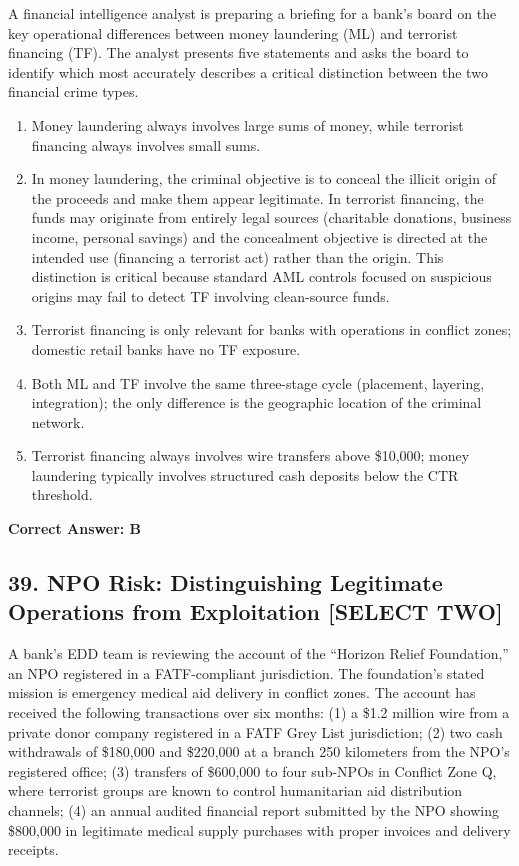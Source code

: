 \documentclass[11pt,a4paper]{article}
\begin{document}
	A financial intelligence analyst is preparing a briefing for a bank's board on the key operational differences between money laundering (ML) and terrorist financing (TF). The analyst presents five statements and asks the board to identify which most accurately describes a critical distinction between the two financial crime types.
	
	\begin{enumerate}[label=\Alph*.]
		\item Money laundering always involves large sums of money, while terrorist financing always involves small sums.
		\item In money laundering, the criminal objective is to conceal the illicit origin of the proceeds and make them appear legitimate. In terrorist financing, the funds may originate from entirely legal sources (charitable donations, business income, personal savings) and the concealment objective is directed at the intended use (financing a terrorist act) rather than the origin. This distinction is critical because standard AML controls focused on suspicious origins may fail to detect TF involving clean-source funds.
		\item Terrorist financing is only relevant for banks with operations in conflict zones; domestic retail banks have no TF exposure.
		\item Both ML and TF involve the same three-stage cycle (placement, layering, integration); the only difference is the geographic location of the criminal network.
		\item Terrorist financing always involves wire transfers above \$10,000; money laundering typically involves structured cash deposits below the CTR threshold.
	\end{enumerate}
	\textbf{Correct Answer: B}
	
	\subsection{39. NPO Risk: Distinguishing Legitimate Operations from Exploitation \textnormal{[SELECT TWO]}}
	
	A bank's EDD team is reviewing the account of the ``Horizon Relief Foundation,'' an NPO registered in a FATF-compliant jurisdiction. The foundation's stated mission is emergency medical aid delivery in conflict zones. The account has received the following transactions over six months: (1) a \$1.2 million wire from a private donor company registered in a FATF Grey List jurisdiction; (2) two cash withdrawals of \$180,000 and \$220,000 at a branch 250 kilometers from the NPO's registered office; (3) transfers of \$600,000 to four sub-NPOs in Conflict Zone Q, where terrorist groups are known to control humanitarian aid distribution channels; (4) an annual audited financial report submitted by the NPO showing \$800,000 in legitimate medical supply purchases with proper invoices and delivery receipts.
	
\end{document}
